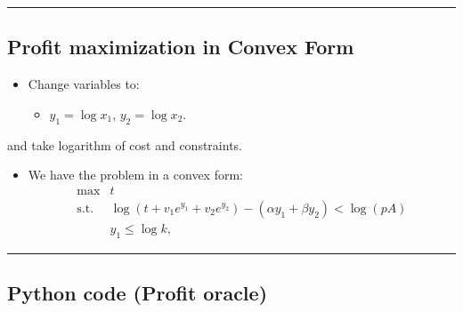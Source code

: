 \documentclass[]{article}
\providecommand{\tightlist}{%
  \setlength{\itemsep}{0pt}\setlength{\parskip}{0pt}}
\begin{document}
\begin{center}\rule{0.5\linewidth}{\linethickness}\end{center}

\hypertarget{profit-maximization-in-convex-form}{%
\subsection{Profit maximization in Convex
Form}\label{profit-maximization-in-convex-form}}

\begin{itemize}
\item
  Change variables to:

  \begin{itemize}
  \tightlist
  \item
    \(y_1 = \log x_1\), \(y_2 = \log x_2\).
  \end{itemize}
\end{itemize}

and take logarithm of cost and constraints.

\begin{itemize}
\tightlist
\item
  We have the problem in a convex form: \[\begin{array}{ll}
    \text{max}  & t \\
    \text{s.t.} & \log(t + v_1 e^{y_1} + v_2 e^{y_2}) - (\alpha y_1 + \beta y_2) < \log(pA)  \\
                  & y_1 \le \log k ,
    \end{array}\]
\end{itemize}

\begin{center}\rule{0.5\linewidth}{\linethickness}\end{center}

\hypertarget{python-code-profit-oracle}{%
\subsection{Python code (Profit
oracle)}\label{python-code-profit-oracle}}
\end{document}
